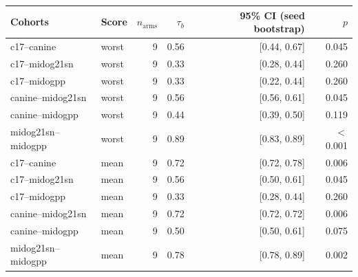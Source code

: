 \begin{tabular}{llrrrr}
\toprule
Cohorts & Score & $n_\text{arms}$ & $\tau_b$ & 95\% CI (seed bootstrap) & $p$ \\
\midrule
c17--canine & worst & 9 & 0.56 & [0.44, 0.67] & 0.045 \\
c17--midog21sn & worst & 9 & 0.33 & [0.28, 0.44] & 0.260 \\
c17--midogpp & worst & 9 & 0.33 & [0.22, 0.44] & 0.260 \\
canine--midog21sn & worst & 9 & 0.56 & [0.56, 0.61] & 0.045 \\
canine--midogpp & worst & 9 & 0.44 & [0.39, 0.50] & 0.119 \\
midog21sn--midogpp & worst & 9 & 0.89 & [0.83, 0.89] & $<$0.001 \\
c17--canine & mean & 9 & 0.72 & [0.72, 0.78] & 0.006 \\
c17--midog21sn & mean & 9 & 0.56 & [0.50, 0.61] & 0.045 \\
c17--midogpp & mean & 9 & 0.33 & [0.28, 0.44] & 0.260 \\
canine--midog21sn & mean & 9 & 0.72 & [0.72, 0.72] & 0.006 \\
canine--midogpp & mean & 9 & 0.50 & [0.50, 0.61] & 0.075 \\
midog21sn--midogpp & mean & 9 & 0.78 & [0.78, 0.89] & 0.002 \\
\bottomrule
\end{tabular}
